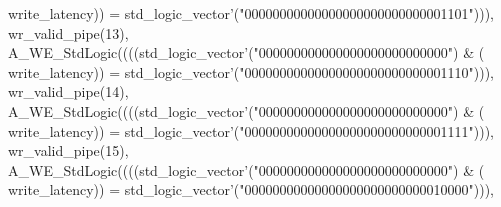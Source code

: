 \begin{DoxyCode}
{      write_latency}\textcolor{vhdlchar}{)}\textcolor{vhdlchar}{)} \textcolor{vhdlchar}{=} \textcolor{comment}{std\_logic\_vector}\textcolor{vhdlchar}{'}\textcolor{vhdlchar}{(}\textcolor{vhdllogic}{"00000000000000000000000000001101"}\textcolor{vhdlchar}{)}\textcolor{vhdlchar}{)}\textcolor{vhdlchar}{)}\textcolor{vhdlchar}{,} \textcolor{vhdlchar}{
      wr_valid_pipe}\textcolor{vhdlchar}{(}\textcolor{vhdllogic}{}\textcolor{vhdllogic}{13}\textcolor{vhdlchar}{)}\textcolor{vhdlchar}{,} \textcolor{vhdlchar}{A\_WE\_StdLogic}\textcolor{vhdlchar}{(}\textcolor{vhdlchar}{(}\textcolor{vhdlchar}{(}\textcolor{vhdlchar}{(}\textcolor{comment}{std\_logic\_vector}\textcolor{vhdlchar}{'}\textcolor{vhdlchar}{(}\textcolor{vhdllogic}{"000000000000000000000000000"}\textcolor{vhdlchar}{)} \textcolor{vhdlchar}{&} \textcolor{vhdlchar}{(}\textcolor{vhdlchar}{
      write_latency}\textcolor{vhdlchar}{)}\textcolor{vhdlchar}{)} \textcolor{vhdlchar}{=} \textcolor{comment}{std\_logic\_vector}\textcolor{vhdlchar}{'}\textcolor{vhdlchar}{(}\textcolor{vhdllogic}{"00000000000000000000000000001110"}\textcolor{vhdlchar}{)}\textcolor{vhdlchar}{)}\textcolor{vhdlchar}{)}\textcolor{vhdlchar}{,} \textcolor{vhdlchar}{
      wr_valid_pipe}\textcolor{vhdlchar}{(}\textcolor{vhdllogic}{}\textcolor{vhdllogic}{14}\textcolor{vhdlchar}{)}\textcolor{vhdlchar}{,} \textcolor{vhdlchar}{A\_WE\_StdLogic}\textcolor{vhdlchar}{(}\textcolor{vhdlchar}{(}\textcolor{vhdlchar}{(}\textcolor{vhdlchar}{(}\textcolor{comment}{std\_logic\_vector}\textcolor{vhdlchar}{'}\textcolor{vhdlchar}{(}\textcolor{vhdllogic}{"000000000000000000000000000"}\textcolor{vhdlchar}{)} \textcolor{vhdlchar}{&} \textcolor{vhdlchar}{(}\textcolor{vhdlchar}{
      write_latency}\textcolor{vhdlchar}{)}\textcolor{vhdlchar}{)} \textcolor{vhdlchar}{=} \textcolor{comment}{std\_logic\_vector}\textcolor{vhdlchar}{'}\textcolor{vhdlchar}{(}\textcolor{vhdllogic}{"00000000000000000000000000001111"}\textcolor{vhdlchar}{)}\textcolor{vhdlchar}{)}\textcolor{vhdlchar}{)}\textcolor{vhdlchar}{,} \textcolor{vhdlchar}{
      wr_valid_pipe}\textcolor{vhdlchar}{(}\textcolor{vhdllogic}{}\textcolor{vhdllogic}{15}\textcolor{vhdlchar}{)}\textcolor{vhdlchar}{,} \textcolor{vhdlchar}{A\_WE\_StdLogic}\textcolor{vhdlchar}{(}\textcolor{vhdlchar}{(}\textcolor{vhdlchar}{(}\textcolor{vhdlchar}{(}\textcolor{comment}{std\_logic\_vector}\textcolor{vhdlchar}{'}\textcolor{vhdlchar}{(}\textcolor{vhdllogic}{"000000000000000000000000000"}\textcolor{vhdlchar}{)} \textcolor{vhdlchar}{&} \textcolor{vhdlchar}{(}\textcolor{vhdlchar}{
      write_latency}\textcolor{vhdlchar}{)}\textcolor{vhdlchar}{)} \textcolor{vhdlchar}{=} \textcolor{comment}{std\_logic\_vector}\textcolor{vhdlchar}{'}\textcolor{vhdlchar}{(}\textcolor{vhdllogic}{"00000000000000000000000000010000"}\textcolor{vhdlchar}{)}\textcolor{vhdlchar}{)}\textcolor{vhdlchar}{)}\textcolor{vhdlchar}{,} \textcolor{vhdlchar}{
}
\end{DoxyCode}
